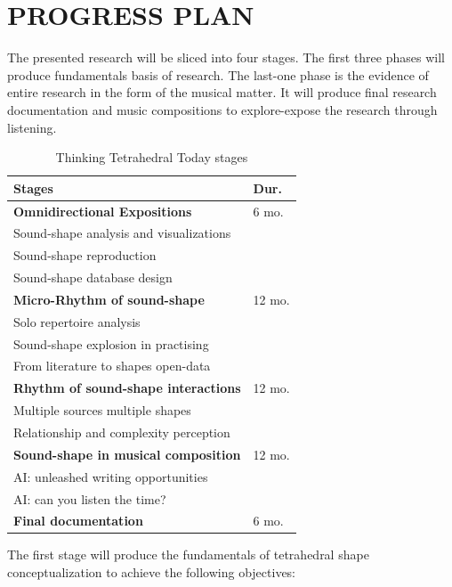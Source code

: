 \documentclass[
	a4paper,
	twocolumn
	]{article}
\begin{document}
\section*{PROGRESS PLAN}

The presented research will be sliced into four stages. The first three phases will produce fundamentals basis of research. The last-one phase is the evidence of entire research in the form of the musical matter. It will produce final research documentation and music compositions to explore-expose the research through listening.

\begin{table}[htp]
\begin{center}
\begin{tabular}{ll}
\textbf{Stages} & \textbf{Dur.} \\
\hline
\textbf{Omnidirectional Expositions} & 6 mo. \\
Sound-shape analysis and visualizations & \\
Sound-shape reproduction & \\
Sound-shape database design & \\
\hline
\textbf{Micro-Rhythm of sound-shape} & 12 mo. \\
Solo repertoire analysis & \\
Sound-shape explosion in practising & \\
From literature to shapes open-data & \\
\hline
\textbf{Rhythm of sound-shape interactions} & 12 mo. \\
Multiple sources multiple shapes & \\
Relationship and complexity perception & \\
\hline
\textbf{Sound-shape in musical composition} & 12 mo. \\
AI: unleashed writing opportunities & \\
AI: can you listen the time? & \\
\hline
\textbf{Final documentation} & 6 mo. \\
\end{tabular}
\label{timesheet}
\caption{Thinking Tetrahedral Today stages}
\end{center}
\end{table}%

The first stage will produce the fundamentals of tetrahedral shape conceptualization to achieve the following objectives:
\end{document}
